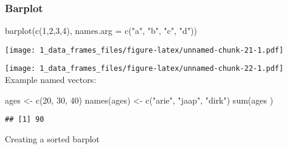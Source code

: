 \documentclass[
]{article}
\newenvironment{Shaded}{\begin{snugshade}}{\end{snugshade}}
\newcommand{\AttributeTok}[1]{\textcolor[rgb]{0.77,0.63,0.00}{#1}}
\newcommand{\ConstantTok}[1]{\textcolor[rgb]{0.00,0.00,0.00}{#1}}
\newcommand{\DecValTok}[1]{\textcolor[rgb]{0.00,0.00,0.81}{#1}}
\newcommand{\FunctionTok}[1]{\textcolor[rgb]{0.00,0.00,0.00}{#1}}
\newcommand{\NormalTok}[1]{#1}
\newcommand{\OtherTok}[1]{\textcolor[rgb]{0.56,0.35,0.01}{#1}}
\newcommand{\SpecialCharTok}[1]{\textcolor[rgb]{0.00,0.00,0.00}{#1}}
\newcommand{\StringTok}[1]{\textcolor[rgb]{0.31,0.60,0.02}{#1}}
\begin{document}
\hypertarget{barplot}{%
\subsubsection{Barplot}\label{barplot}}

\begin{Shaded}
\begin{Highlighting}[]
\FunctionTok{barplot}\NormalTok{(}\FunctionTok{c}\NormalTok{(}\DecValTok{1}\NormalTok{,}\DecValTok{2}\NormalTok{,}\DecValTok{3}\NormalTok{,}\DecValTok{4}\NormalTok{), }\AttributeTok{names.arg =} \FunctionTok{c}\NormalTok{(}\StringTok{"a"}\NormalTok{, }\StringTok{"b"}\NormalTok{, }\StringTok{"c"}\NormalTok{, }\StringTok{"d"}\NormalTok{))}
\end{Highlighting}
\end{Shaded}

\texttt{[image: 1\_data\_frames\_files/figure-latex/unnamed-chunk-21-1.pdf]}

\begin{Shaded}
\end{Shaded}

\texttt{[image: 1\_data\_frames\_files/figure-latex/unnamed-chunk-22-1.pdf]}
Example named vectors:

\begin{Shaded}
\begin{Highlighting}[]
\NormalTok{ages }\OtherTok{\textless{}{-}} \FunctionTok{c}\NormalTok{(}\DecValTok{20}\NormalTok{, }\DecValTok{30}\NormalTok{, }\DecValTok{40}\NormalTok{)}
\FunctionTok{names}\NormalTok{(ages) }\OtherTok{\textless{}{-}} \FunctionTok{c}\NormalTok{(}\StringTok{"arie"}\NormalTok{, }\StringTok{"jaap"}\NormalTok{, }\StringTok{"dirk"}\NormalTok{)}
\FunctionTok{sum}\NormalTok{(ages )}
\end{Highlighting}
\end{Shaded}

\begin{verbatim}
## [1] 90
\end{verbatim}

Creating a sorted barplot

\begin{Shaded}
\end{Shaded}
\end{document}
